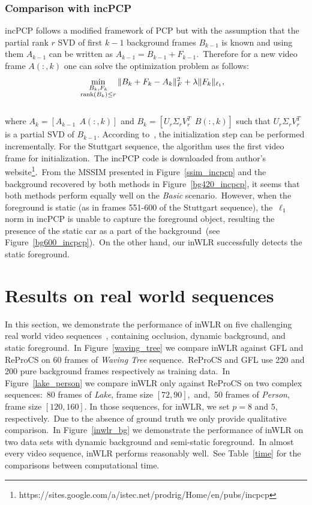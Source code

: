 \documentclass[10pt,twocolumn,letterpaper]{article}
\begin{document}
\subsubsection{Comparison with incPCP~\cite{incpcp}}
\vspace{-0.0in}
incPCP follows a modified framework of PCP but with the assumption that the partial rank $r$ SVD of first $k-1$ background frames $B_{k-1}$ is known and using them $A_{k-1}$ can be written as $A_{k-1}=B_{k-1}+F_{k-1}$.~Therefore for a new video frame $A(:,k)$ one can solve the optimization problem as follows:
~\\[-0.1in]
\begin{align*}\label{reprocs_problem}
&\min_{\substack{B_k,F_k\\{\rm rank}(B_k)\le r}}\|B_k+F_k-A_k\|_F^2+\lambda\|F_k\|_{\ell_1},
\end{align*}
~\\[-0.15in]
where $A_k = [A_{k-1}~~A(:,k)]$ and $B_k = [U_r\Sigma_rV_r^T~~B(:,k)]$ such that $U_r\Sigma_rV_r^T$ is a partial SVD of $B_{k-1}.$ According to~\cite{incpcp}, the initialization step can be performed incrementally. For the Stuttgart sequence, the algorithm uses the first video frame for initialization.~The incPCP code is downloaded from author's website\footnote{https://sites.google.com/a/istec.net/prodrig/Home/en/pubs/incpcp}.~From the MSSIM presented in Figure~\ref{ssim_incpcp} and the background recovered by both methods in Figure~\ref{bg420_incpcp}, it seems that both methods perform equally well on the {\it Basic} scenario.~However, when the foreground is static (as in frames 551-600 of the Stuttgart sequence), the~$\ell_1$ norm in incPCP is unable to capture the foreground object, resulting the presence of the static car as a part of the background~(see Figure~\ref{bg600_incpcp}).~On the other hand, our inWLR successfully detects the static foreground.


\vspace{-0.1in}
\section{Results on real world sequences}
\vspace{-0.07in}
 In this section, we demonstrate the performance of
inWLR on five challenging real world video
sequences~\cite{lidata,wallflower}, containing occlusion, dynamic
background, and static foreground.~In Figure~\ref{waving_tree} we
compare inWLR against GFL and ReProCS on 60 frames of {\it Waving Tree} sequence.~ReProCS and GFL use 220 and
200 pure background frames respectively as training data.~In
Figure~\ref{lake_person} we compare inWLR only against ReProCS on
two complex sequences:~80 frames of {\it Lake}, frame size $[72,90]$,~and,~50 frames of {\it Person}, frame size $[120,160]$. In those sequences, for inWLR, we set $p=8$ and $5$, respectively.~Due to the
absence of ground truth we only provide qualitative comparison.~In
Figure~\ref{inwlr_bg} we demonstrate the performance of inWLR on two
data sets with dynamic background and semi-static foreground.~In
almost every video sequence, inWLR performs reasonably well.~See
Table~\ref{time} for the comparisons between computational time.
\end{document}
